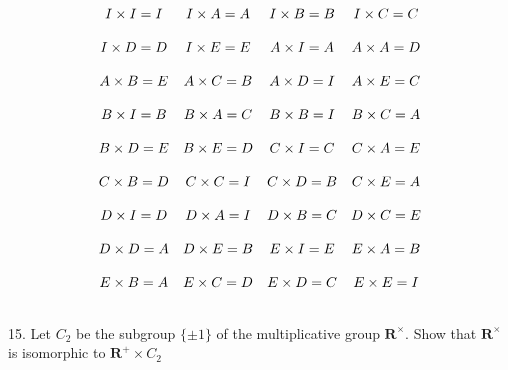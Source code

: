 $$\begin{matrix}
  I \times I = I &
  I \times A = A &
  I \times B = B &
  I \times C = C \\ \hspace{.5in} \\
  I \times D = D &
  I \times E = E &
  A \times I = A &
  A \times A = D \\ \hspace{.5in} \\
  A \times B = E &
  A \times C = B &
  A \times D = I &
  A \times E = C \\ \hspace{.5in} \\
  B \times I = B &
  B \times A = C &
  B \times B = I &
  B \times C = A \\ \hspace{.5in} \\
  B \times D = E &
  B \times E = D &
  C \times I = C &
  C \times A = E \\ \hspace{.5in} \\
  C \times B = D &
  C \times C = I &
  C \times D = B &
  C \times E = A \\ \hspace{.5in} \\
  D \times I = D &
  D \times A = I &
  D \times B = C &
  D \times C = E \\ \hspace{.5in} \\
  D \times D = A &
  D \times E = B &
  E \times I = E &
  E \times A = B \\ \hspace{.5in} \\
  E \times B = A &
  E \times C = D &
  E \times D = C &
  E \times E = I \\ \hspace{.5in} \\
\end{matrix}$$
\newpage
\begin{mdframed}[style=darkQuesion]
15. Let $C_{2}$ be the subgroup $\{\pm 1\}$ of the multiplicative group
$\mathbf{R}^{\times} .$ Show that $\mathbf{R}^{\times}$ is isomorphic to
$\mathbf{R}^{+} \times C_{2}$
\end{mdframed}
